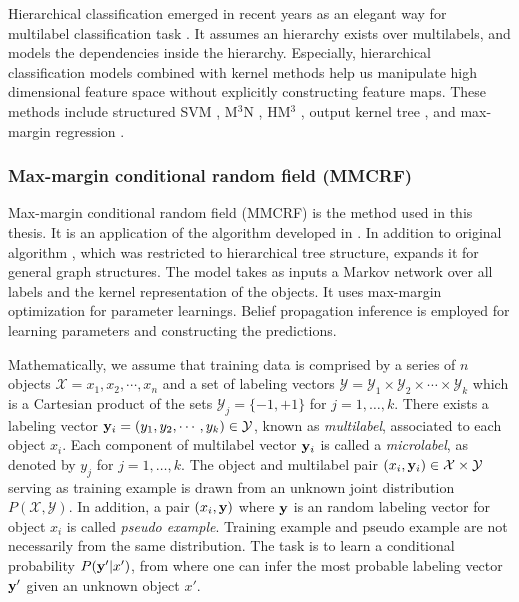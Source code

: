 \documentclass[english]{tktltiki}
\newcommand{\Xcal}{\mathcal{X}} %
\newcommand{\Ycal}{\mathcal{Y}} %
\newcommand{\yb}{{\bf y}}
\begin{document}
Hierarchical classification emerged in recent years as an elegant way for multilabel classification task \cite{silla10}. It assumes an hierarchy exists over multilabels, and models the dependencies inside the hierarchy. Especially, hierarchical classification models combined with kernel methods help us manipulate high dimensional feature space without explicitly constructing feature maps. These methods include structured SVM \cite{THJA04}, M$^3$N \cite{taskar03}, HM$^3$ \cite{rousu2006kbl,rousu2007}, output kernel tree \cite{wehenkel06}, and max-margin regression \cite{szedmak06}. 


\subsubsection{Max-margin conditional random field (MMCRF)}

Max-margin conditional random field (MMCRF) is the method used in this thesis. It is an application of the algorithm developed in \cite{rousu2007}. In addition to original algorithm \cite{rousu2006kbl}, which was restricted to hierarchical tree structure, \cite{rousu2007} expands it for general graph structures. The model takes as inputs a Markov network over all labels and the kernel representation of the objects. It uses max-margin optimization for parameter learnings. Belief propagation inference is employed for learning parameters and constructing the predictions.

Mathematically, we assume that training data is comprised by a series of $n$ objects $\Xcal = x_1, x_2,\cdots,x_n$ and a set of labeling vectors $\Ycal = \Ycal_1 \times \Ycal_2 \times \cdots \times \Ycal_k$ which is a Cartesian product of the sets $\Ycal_j = \{-1,+1\}$ for $j = 1,\ldots, k$. There exists a labeling vector $\yb_i = (y_1,y_2,\cdots,y_k) \in \Ycal$, known as {\em multilabel}, associated to each object $x_i$. Each component of multilabel vector $\yb_i$ is called a {\em microlabel}, as denoted by $y_j$ for $j=1,\ldots,k$. The object and multilabel pair $(x_i,\yb_i) \in \Xcal \times \Ycal$ serving as training example is drawn from an unknown joint distribution $P(\Xcal, \Ycal)$. In addition, a pair $(x_i, \yb)$ where $\yb$ is an random labeling vector for object $x_i$ is called {\em pseudo example}. Training example and pseudo example are not necessarily from the same distribution. The task is to learn a conditional probability $P(\yb'|x')$, from where one can infer the most probable labeling vector $\yb'$ given an unknown object $x'$.
\end{document}
